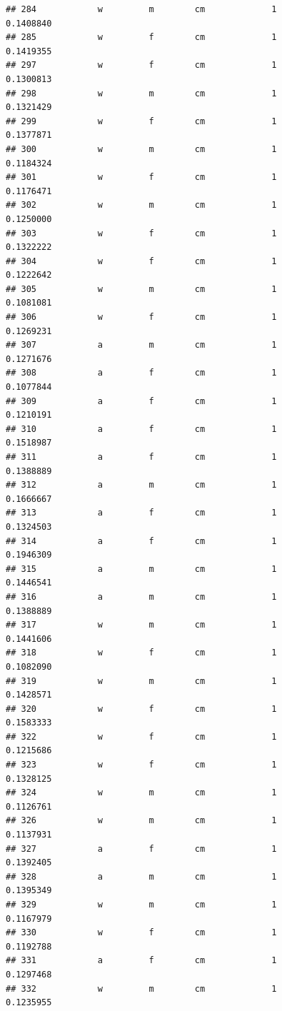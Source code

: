 \documentclass[]{article}
\begin{document}
\begin{verbatim}
## 284            w         m        cm             1          0.1408840
## 285            w         f        cm             1          0.1419355
## 297            w         f        cm             1          0.1300813
## 298            w         m        cm             1          0.1321429
## 299            w         f        cm             1          0.1377871
## 300            w         m        cm             1          0.1184324
## 301            w         f        cm             1          0.1176471
## 302            w         m        cm             1          0.1250000
## 303            w         f        cm             1          0.1322222
## 304            w         f        cm             1          0.1222642
## 305            w         m        cm             1          0.1081081
## 306            w         f        cm             1          0.1269231
## 307            a         m        cm             1          0.1271676
## 308            a         f        cm             1          0.1077844
## 309            a         f        cm             1          0.1210191
## 310            a         f        cm             1          0.1518987
## 311            a         f        cm             1          0.1388889
## 312            a         m        cm             1          0.1666667
## 313            a         f        cm             1          0.1324503
## 314            a         f        cm             1          0.1946309
## 315            a         m        cm             1          0.1446541
## 316            a         m        cm             1          0.1388889
## 317            w         m        cm             1          0.1441606
## 318            w         f        cm             1          0.1082090
## 319            w         m        cm             1          0.1428571
## 320            w         f        cm             1          0.1583333
## 322            w         f        cm             1          0.1215686
## 323            w         f        cm             1          0.1328125
## 324            w         m        cm             1          0.1126761
## 326            w         m        cm             1          0.1137931
## 327            a         f        cm             1          0.1392405
## 328            a         m        cm             1          0.1395349
## 329            w         m        cm             1          0.1167979
## 330            w         f        cm             1          0.1192788
## 331            a         f        cm             1          0.1297468
## 332            w         m        cm             1          0.1235955

\end{verbatim}
\end{document}
